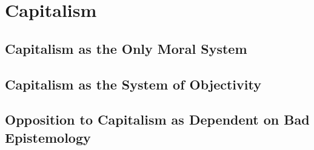 \chapter{Capitalism}

    \section{Capitalism as the Only Moral System}

    \section{Capitalism as the System of Objectivity}

    \section{Opposition to Capitalism as Dependent on Bad Epistemology}